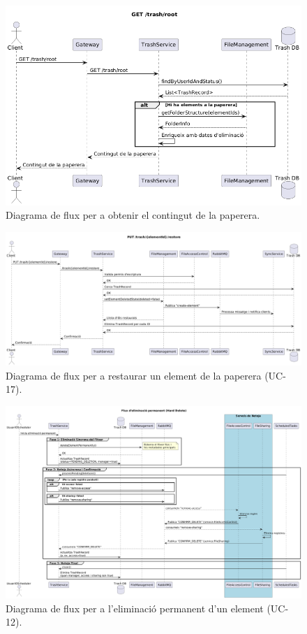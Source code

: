 \begin{figure}[H]
    \centering
    \includegraphics[width=1\textwidth]{Figures/flux/get_trash_root.png}
    \caption{Diagrama de flux per a obtenir el contingut de la paperera.}
    \label{fig:flow_get_trash_root}
\end{figure}

\begin{figure}[H]
    \centering
    \includegraphics[width=1\textwidth]{Figures/flux/restore_deleted_files.png}
    \caption{Diagrama de flux per a restaurar un element de la paperera (UC-17).}
    \label{fig:flow_restore_deleted_files}
\end{figure}

\begin{figure}[H]
    \centering
    \includegraphics[width=1\textwidth]{Figures/flux/permanent_delete_files.png}
    \caption{Diagrama de flux per a l'eliminació permanent d'un element (UC-12).}
    \label{fig:flow_permanent_delete_files}
\end{figure}

